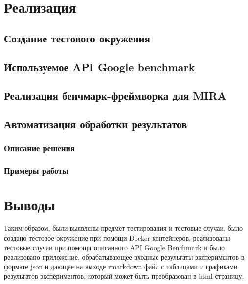 \section{Реализация}
	\subsection{Создание тестового окружения}
	\label{title:chapter2:testing_environment_description}
	
	\subsection{Используемое API Google benchmark}
	\label{title:chapter2:testing_google_benchmark_api}
	
	\subsection{Реализация бенчмарк-фреймворка для MIRA}

		\label{title:chapter2:mira_test_details}
		
		
	\subsection{Автоматизация обработки результатов}
	\label{title:chapter2:testing_analyser}
		\subsubsection{Описание решения}
		\label{title:chapter2:testing_analyser_description}
		
		\subsubsection{Примеры работы}
		\label{title:chapter2:analyser_examples}
		
\section{Выводы}
	Таким образом, были выявлены предмет тестирования и тестовые случаи, было создано тестовое окружение при помощи Docker-контейнеров, реализованы тестовые случаи при помощи описанного API Google Benchmark и было реализовано приложение, обрабатывающее входные результаты экспериментов в формате json и дающее на выходе rmarkdown файл с таблицами и графиками результатов экспериментов, который может быть преобразован в html страницу.

